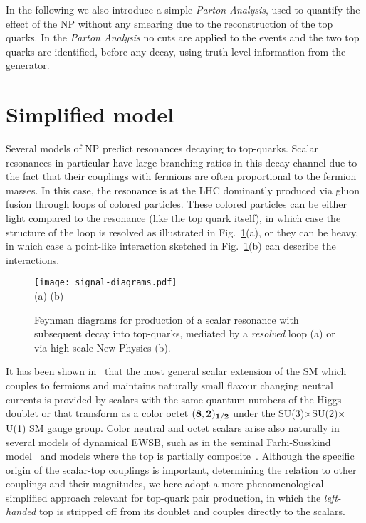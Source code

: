 \documentclass[aps,prd,amsmath,amssymb,superscriptaddress, preprintnumbers,preprint,nofootinbib,a4paper]{revtex4}
\def\fig#1{{fig.~(\ref{#1})}}
\begin{document}
In the following we also introduce a simple \emph{Parton Analysis}, used to quantify the effect of the NP without
any smearing due to the reconstruction of the top quarks. In the \emph{Parton Analysis} no cuts are applied to the
events and the two top quarks are identified, before any decay, using truth-level information from the generator.

\section{Simplified model}
\label{sec:model}

Several models of NP predict resonances decaying to top-quarks. Scalar resonances in particular have
large branching ratios in this decay channel due to the fact that their couplings with fermions are often
proportional to the fermion masses. In this case, the resonance is at the LHC dominantly produced via
gluon fusion through loops of colored particles. These colored particles can be either light compared
to the resonance (like the top quark itself), in which case the structure of the loop is resolved as
illustrated in Fig.~\ref{fig:diag}(a), or they can be heavy, in which case a point-like interaction
sketched in Fig.~\ref{fig:diag}(b) can describe the interactions. 
%

\begin{figure}
\texttt{[image: signal-diagrams.pdf]} \\
(a) \hspace{6.5cm} (b) 
\caption{Feynman diagrams for production of a scalar resonance with subsequent decay into top-quarks, mediated by a \emph{resolved}
  loop (a) or via high-scale New Physics (b).}
\label{fig:diag}
\end{figure}


It has been shown in~\cite{Manohar:2006ga} that the most general scalar extension of the SM which couples to fermions and maintains
naturally small flavour changing neutral currents is provided by scalars with the same quantum numbers of the Higgs doublet
or that transform as a color octet $(\bf 8, 2)_{1/2}$ under the SU(3)$\times$SU(2)$\times$U(1) SM gauge group.
Color neutral and octet scalars arise also naturally in several models of dynamical EWSB, such as in the seminal
Farhi-Susskind model~\cite{Farhi:1980xs} and models where the top is partially composite~\cite{Belyaev:2016ftv}.
Although the specific origin of the scalar-top couplings is important, determining  the relation to other couplings and their magnitudes, we here adopt a more  phenomenological simplified approach relevant for top-quark pair production, in which the \emph{left-handed} top is stripped off from its doublet and couples directly to the scalars. 
\end{document}

